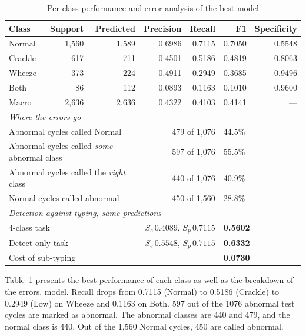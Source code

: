\documentclass[journal,onecolumn]{IEEEtran}
\newcommand{\best}[1]{\textbf{#1}}
\begin{document}
\begin{table}[hbtp]
\centering
\caption{Per-class performance and error analysis of the best model}
\label{tab:errors}
\footnotesize
\begin{tabular}{lrrrrrr}
\toprule
Class & Support & Predicted & Precision & Recall & F1 & Specificity \\
\midrule
Normal  & 1{,}560 & 1{,}589 & 0.6986 & 0.7115 & 0.7050 & 0.5548 \\
Crackle & \phantom{0,}617 & \phantom{0,}711 & 0.4501 & 0.5186 & 0.4819 & 0.8063 \\
Wheeze  & \phantom{0,}373 & \phantom{0,}224 & 0.4911 & 0.2949 & 0.3685 & 0.9496 \\
Both    & \phantom{00,}86 & \phantom{0,}112 & 0.0893 & 0.1163 & 0.1010 & 0.9600 \\
Macro   & 2{,}636 & 2{,}636 & 0.4322 & 0.4103 & 0.4141 & --- \\
\midrule
\multicolumn{7}{l}{\emph{Where the errors go}}\\
\multicolumn{3}{l}{Abnormal cycles called Normal} & \multicolumn{2}{r}{479 of 1{,}076} & \multicolumn{2}{l}{44.5\%} \\
\multicolumn{3}{l}{Abnormal cycles called \emph{some} abnormal class} & \multicolumn{2}{r}{597 of 1{,}076} & \multicolumn{2}{l}{55.5\%} \\
\multicolumn{3}{l}{Abnormal cycles called the \emph{right} class} & \multicolumn{2}{r}{440 of 1{,}076} & \multicolumn{2}{l}{40.9\%} \\
\multicolumn{3}{l}{Normal cycles called abnormal} & \multicolumn{2}{r}{450 of 1{,}560} & \multicolumn{2}{l}{28.8\%} \\
\midrule
\multicolumn{7}{l}{\emph{Detection against typing, same predictions}}\\
\multicolumn{3}{l}{4-class task} & \multicolumn{2}{r}{$S_e\,0.4089$, $S_p\,0.7115$} & \multicolumn{2}{l}{\best{0.5602}} \\
\multicolumn{3}{l}{Detect-only task} & \multicolumn{2}{r}{$S_e\,0.5548$, $S_p\,0.7115$} & \multicolumn{2}{l}{\best{0.6332}} \\
\multicolumn{3}{l}{Cost of sub-typing} & \multicolumn{2}{r}{} & \multicolumn{2}{l}{\best{0.0730}} \\
\bottomrule
\end{tabular}
\end{table}

Table~\ref{tab:errors} presents the best performance of each class as well as the breakdown of the errors.
model. Recall drops from 0.7115 (Normal) to 0.5186 (Crackle) to 0.2949 (Low)
on Wheeze and 0.1163 on Both. 597 out of the 1076 abnormal test cycles are marked as abnormal.
The abnormal classes are 440 and 479, and the normal class is 440. Out of the 1,560
Normal cycles, 450 are called abnormal.
\end{document}
